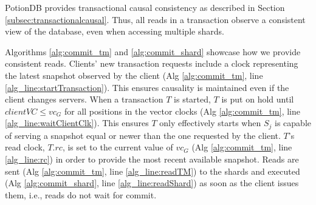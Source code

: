 \documentclass[sigplan,10pt]{acmart}
\begin{document}
PotionDB provides transactional causal consistency as described in Section \ref{subsec:transactionalcausal}.
Thus, all reads in a transaction observe a consistent view of the database, even when accessing multiple shards.

Algorithms \ref{alg:commit_tm} and \ref{alg:commit_shard} showcase how we provide consistent reads.
Clients' new transaction requests include a clock representing the latest snapshot observed by the client (Alg \ref{alg:commit_tm}, line \ref{alg_line:startTransaction}). %
This ensures causality is maintained even if the client changes servers.
When a transaction $T$ is started, $T$ is put on hold until $\mathit{clientVC} \leq vc_G$ for all positions in the vector clocks (Alg \ref{alg:commit_tm}, line \ref{alg_line:waitClientClk}).
This ensures $T$ only effectively starts when $S_j$ is capable of serving a snapshot equal or newer than the one requested by the client.
$T$'s read clock, $T.rc$, is set to the current value of $vc_G$ (Alg \ref{alg:commit_tm}, line \ref{alg_line:rc}) in order to provide the most recent available snapshot.
Reads are sent (Alg \ref{alg:commit_tm}, line \ref{alg_line:readTM}) to the shards and executed (Alg \ref{alg:commit_shard}, line \ref{alg_line:readShard}) as soon as the client issues them, i.e., reads do not wait for commit.

\end{document}
